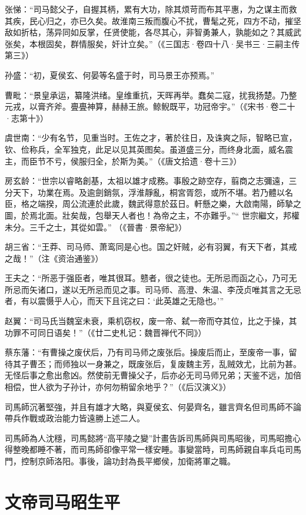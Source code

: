 张悌：“司马懿父子，自握其柄，累有大功，除其烦苛而布其平惠，为之谋主而救其疾，民心归之，亦已久矣。故淮南三叛而腹心不扰，曹髦之死，四方不动，摧坚敌如折枯，荡异同如反掌，任贤使能，各尽其心，非智勇兼人，孰能如之？其威武张矣，本根固矣，群情服矣，奸计立矣。”（《三国志·卷四十八·吴书三·三嗣主传第三》）

孙盛：“初，夏侯玄、何晏等名盛于时，司马景王亦预焉。”

曹毗：“景皇承运，纂隆洪绪。皇维重抗，天晖再举。蠢矣二寇，扰我扬楚。乃整元戎，以膏齐斧。亹亹神算，赫赫王旅。鲸鲵既平，功冠帝宇。”（《宋书·卷二十·志第十》）

虞世南：“少有名节，见重当时。王佐之才，著於往日，及诛爽之际，智略已宣，钦、俭称兵，全军独克，此足以见其英图矣。虽道盛三分，而终身北面，威名震主，而臣节不亏，侯服归全，於斯为美。”（《唐文拾遗·卷十三》）

房玄龄：“世宗以睿略創基，太祖以雄才成務。事殷之跡空存，翦商之志彌遠，三分天下，功業在焉。及逾劍銷氛，浮淮靜亂，桐宮胥怨，或所不堪。若乃體以名臣，格之端揆，周公流連於此歲，魏武得意於茲日。軒懸之樂，大啟南陽，師摯之圖，於焉北面。壯矣哉，包舉天人者也！為帝之主，不亦難乎。”“ 世宗繼文，邦權未分。三千之士，其從如雲。” （《晉書·景帝紀》）

胡三省：“王莽、司马师、萧鸾同是心也。国之奸贼，必有羽翼，有天下者，其戒之哉！”（注《资治通鉴》）

王夫之：“所恶于强臣者，唯其很耳。戆者，很之徒也。无所忌而函之心，乃可无所忌而矢诸口，遂以无所忌而见之事。司马师、高澄、朱温、李茂贞唯其言之无忌者，有以震慑乎人心，而天下且诧之曰：‘此英雄之无隐也。’”

赵翼：“司马氏当魏室未衰，乘机窃权，废一帝、弑一帝而夺其位，比之于操，其功罪不可同日语矣！”（《廿二史札记：魏晋禅代不同》）

蔡东藩：“有曹操之废伏后，乃有司马师之废张后。操废后而止，至废帝一事，留待其子曹丕；而师独以一身兼之，既废张后，复废魏主芳，乱贼效尤，比前为甚。无怪后事之愈出愈凶。然使前无曹操父子，后亦必无司马师兄弟；天鉴不远，加倍相偿，世人欲为子孙计，亦何勿稍留余地乎？”（《后汉演义》）

司馬師沉著堅強，并且有雄才大略，與夏侯玄、何晏齊名，雖言齊名但司馬師不論帶兵作戰或政治能力皆遠勝上述二人。

司馬師為人沈穩，司馬懿將“高平陵之變”計畫告訴司馬師與司馬昭後，司馬昭擔心得整晚都睡不著，而司馬師卻像平常一樣安睡。事變當時，司馬師親自率兵屯司馬門，控制京師洛阳。事後，論功封為長平鄉侯，加衛將軍之職。

\section{文帝司马昭生平}

